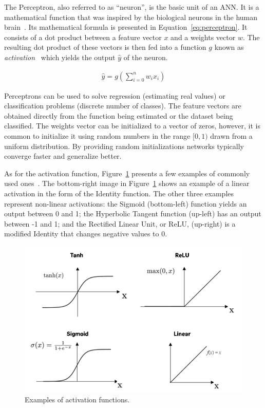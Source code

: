 The Perceptron, also referred to as ``neuron'', is the basic unit of an ANN. It
is a mathematical function that was inspired by the biological neurons in the
human brain~\cite{rosenblatt1958perceptron}. Its mathematical formula is presented in Equation~\ref{eq:perceptron}. It consists of a dot product between a feature vector $x$
and a weights vector $w$. The resulting dot product of these vectors is then fed
into a function $g$ known as \textit{activation}~\cite{activation_functions} which yields the output
$\hat{y}$ of the neuron.

\begin{align}
    \hat{y} = g\left(\sum^n_{i=0} w_ix_i\right)
    \label{eq:perceptron}
\end{align}

Perceptrons can be used to solve regression (estimating real values) or
classification problems (discrete number of classes). The feature vectors are
obtained directly from the function being estimated or the dataset being
classified. The weights vector can be initialized to a vector of zeros, however,
it is common to initialize it using random numbers in the range $[0,1)$ drawn
from a uniform distribution. By providing random initializations networks
typically converge faster and generalize better.

As for the activation function, Figure~\ref{fig:activations} presents a few
examples of commonly used ones~\cite{activation_functions}. The bottom-right image in
Figure~\ref{fig:activations} shows an example of a linear activation in the form
of the Identity function. The other three examples represent non-linear
activations: the Sigmoid (bottom-left) function yields an output between 0 and
1; the Hyperbolic Tangent function (up-left) has an output between -1 and 1; and
the Rectified Linear Unit, or ReLU, (up-right) is a modified Identity that
changes negative values to 0.

\begin{figure}[!htbp]
    \centering
    \includegraphics[width=.5\textwidth]{Images/activations.jpg}
    \caption{Examples of activation functions.}
    \label{fig:activations}
\end{figure}

